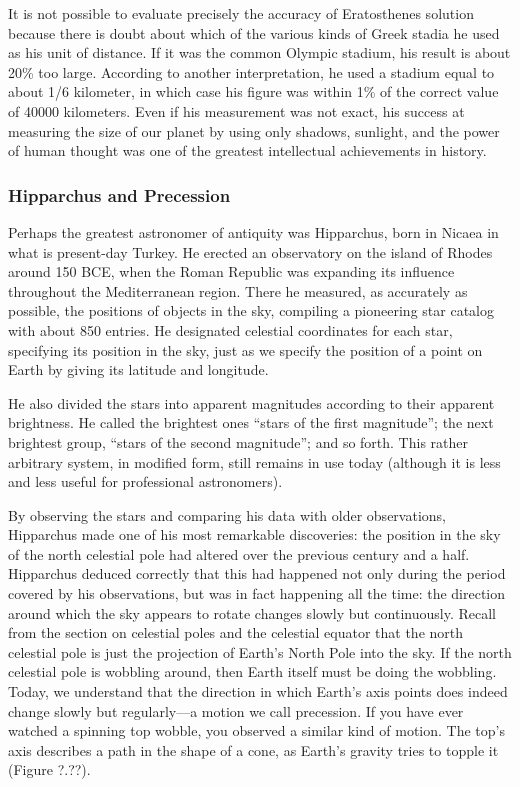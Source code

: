\documentclass[main.tex]{subfiles}
\begin{document}

\vspace{1em}

It is not possible to evaluate precisely the accuracy of Eratosthenes solution because there is doubt about which of the various kinds of Greek stadia he used as his unit of distance. If it was the common Olympic stadium, his result is about 20\% too large. According to another interpretation, he used a stadium equal to about 1/6 kilometer, in which case his figure was within 1\% of the correct value of \num{40000} kilometers. Even if his measurement was not exact, his success at measuring the size of our planet by using only shadows, sunlight, and the power of human thought was one of the greatest intellectual achievements in history.

\subsubsection*{Hipparchus and Precession}

Perhaps the greatest astronomer of antiquity was Hipparchus, born in Nicaea in what is present-day Turkey. He erected an observatory on the island of Rhodes around 150 BCE, when the Roman Republic was expanding its influence throughout the Mediterranean region. There he measured, as accurately as possible, the positions of objects in the sky, compiling a pioneering star catalog with about 850 entries. He designated celestial coordinates for each star, specifying its position in the sky, just as we specify the position of a point on Earth by giving its latitude and longitude.

\vspace{1em}

He also divided the stars into \gls{apparent magnitude}s according to their apparent brightness. He called the brightest ones ``stars of the first magnitude''; the next brightest group, ``stars of the second magnitude''; and so forth. This rather arbitrary system, in modified form, still remains in use today (although it is less and less useful for professional astronomers).

\vspace{1em}

By observing the stars and comparing his data with older observations, Hipparchus made one of his most remarkable discoveries: the position in the sky of the north celestial pole had altered over the previous century and a half. Hipparchus deduced correctly that this had happened not only during the period covered by his observations, but was in fact happening all the time: the direction around which the sky appears to rotate changes slowly but continuously. Recall from the section on celestial poles and the celestial equator that the north celestial pole is just the projection of Earth's North Pole into the sky. If the north celestial pole is wobbling around, then Earth itself must be doing the wobbling. Today, we understand that the direction in which Earth's axis points does indeed change slowly but regularly---a motion we call precession. If you have ever watched a spinning top wobble, you observed a similar kind of motion. The top's axis describes a path in the shape of a cone, as Earth's gravity tries to topple it (Figure ?.??).
\end{document}
